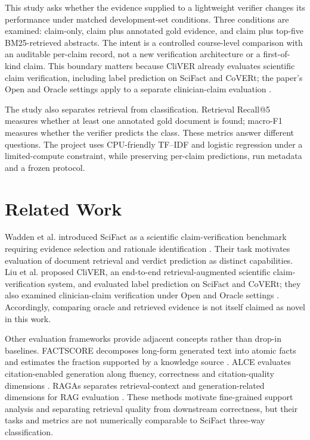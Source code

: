 \documentclass[10pt]{article}
\begin{document}
This study asks whether the evidence supplied to a lightweight verifier changes its performance under matched development-set conditions. Three conditions are examined: claim-only, claim plus annotated gold evidence, and claim plus top-five BM25-retrieved abstracts. The intent is a controlled course-level comparison with an auditable per-claim record, not a new verification architecture or a first-of-kind claim. This boundary matters because CliVER already evaluates scientific claim verification, including label prediction on SciFact and CoVERt; the paper’s Open and Oracle settings apply to a separate clinician-claim evaluation \citep{liu2024cliver}. 

The study also separates retrieval from classification. Retrieval Recall@5 measures whether at least one annotated gold document is found; macro-F1 measures whether the verifier predicts the class. These metrics answer different questions. The project uses CPU-friendly TF--IDF and logistic regression under a limited-compute constraint, while preserving per-claim predictions, run metadata and a frozen protocol.

\section{Related Work}
Wadden et al. introduced SciFact as a scientific claim-verification benchmark requiring evidence selection and rationale identification \citep{wadden2020fact}. Their task motivates evaluation of document retrieval and verdict prediction as distinct capabilities. Liu et al. proposed CliVER, an end-to-end retrieval-augmented scientific claim-verification system, and evaluated label prediction on SciFact and CoVERt; they also examined clinician-claim verification under Open and Oracle settings \citep{liu2024cliver}. Accordingly, comparing oracle and retrieved evidence is not itself claimed as novel in this work.

Other evaluation frameworks provide adjacent concepts rather than drop-in baselines. FACTSCORE decomposes long-form generated text into atomic facts and estimates the fraction supported by a knowledge source \citep{min2023factscore}. ALCE evaluates citation-enabled generation along fluency, correctness and citation-quality dimensions \citep{gao2023alce}. RAGAs separates retrieval-context and generation-related dimensions for RAG evaluation \citep{es2024ragas}. These methods motivate fine-grained support analysis and separating retrieval quality from downstream correctness, but their tasks and metrics are not numerically comparable to SciFact three-way classification.
\end{document}
